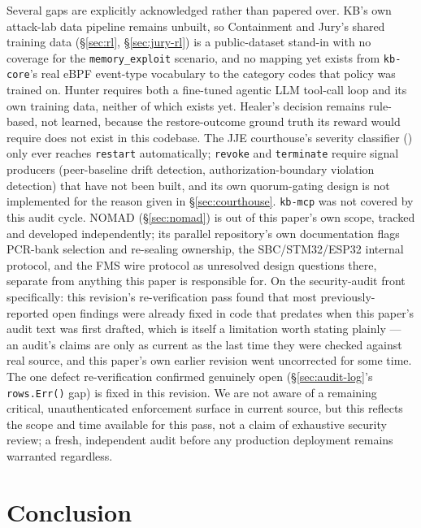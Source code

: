 \documentclass{article}
\begin{document}
Several gaps are explicitly acknowledged rather than papered over.
KB's own attack-lab data pipeline remains unbuilt, so Containment and
Jury's shared training data (\S\ref{sec:rl}, \S\ref{sec:jury-rl}) is a
public-dataset stand-in with no coverage for the
\texttt{memory\_exploit} scenario, and no mapping yet exists from
\texttt{kb-core}'s real eBPF event-type vocabulary to the category
codes that policy was trained on. Hunter requires both a fine-tuned
agentic LLM tool-call loop and its own training data, neither of which
exists yet. Healer's decision remains rule-based, not learned, because
the restore-outcome ground truth its reward would require does not
exist in this codebase. The JJE courthouse's severity classifier
() only ever reaches \texttt{restart}
automatically; \texttt{revoke} and \texttt{terminate} require signal
producers (peer-baseline drift detection, authorization-boundary
violation detection) that have not been built, and its own
quorum-gating design is not implemented for the reason given in
\S\ref{sec:courthouse}. \texttt{kb-mcp} was not covered by this audit
cycle. NOMAD (\S\ref{sec:nomad}) is out of this paper's own scope,
tracked and developed independently; its parallel repository's own
documentation flags PCR-bank selection and re-sealing ownership, the
SBC/STM32/ESP32 internal protocol, and the FMS wire protocol as
unresolved design questions there, separate from anything this paper
is responsible for. On the security-audit front specifically: this revision's
re-verification pass found that most previously-reported open findings
were already fixed in code that predates when this paper's audit text
was first drafted, which is itself a limitation worth stating plainly
--- an audit's claims are only as current as the last time they were
checked against real source, and this paper's own earlier revision went
uncorrected for some time. The one defect re-verification confirmed
genuinely open (\S\ref{sec:audit-log}'s \texttt{rows.Err()} gap) is
fixed in this revision. We are not aware of a remaining critical,
unauthenticated enforcement surface in current source, but this
reflects the scope and time available for this pass, not a claim of
exhaustive security review; a fresh, independent audit before any
production deployment remains warranted regardless.

\section{Conclusion}
\end{document}

